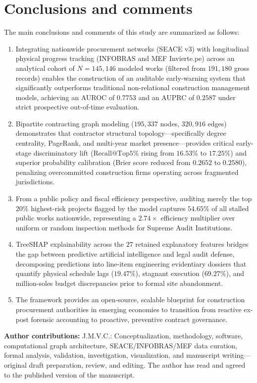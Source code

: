 \documentclass[10pt,a4paper]{article}
\begin{document}
\section*{Conclusions and comments}
The main conclusions and comments of this study are summarized as follows:
\begin{enumerate}
    \item Integrating nationwide procurement networks (SEACE v3) with longitudinal physical progress tracking (INFOBRAS and MEF Invierte.pe) across an analytical cohort of $N = 145,146$ modeled works (filtered from $191,180$ gross records) enables the construction of an auditable early-warning system that significantly outperforms traditional non-relational construction management models, achieving an AUROC of $0.7753$ and an AUPRC of $0.2587$ under strict prospective out-of-time evaluation.
    \item Bipartite contracting graph modeling ($195,337$ nodes, $320,916$ edges) demonstrates that contractor structural topology---specifically degree centrality, PageRank, and multi-year market presence---provides critical early-stage discriminatory lift ($\text{Recall@Top5\%}$ rising from $16.53\%$ to $17.25\%$) and superior probability calibration (Brier score reduced from $0.2652$ to $0.2580$), penalizing overcommitted construction firms operating across fragmented jurisdictions.
    \item From a public policy and fiscal efficiency perspective, auditing merely the top $20\%$ highest-risk projects flagged by the model captures $54.65\%$ of all stalled public works nationwide, representing a $2.74\times$ efficiency multiplier over uniform or random inspection methods for Supreme Audit Institutions.
    \item TreeSHAP explainability across the $27$ retained explanatory features bridges the gap between predictive artificial intelligence and legal audit defense, decomposing predictions into line-item engineering evidentiary dossiers that quantify physical schedule lags ($19.47\%$), stagnant execution ($69.27\%$), and million-soles budget discrepancies prior to formal site abandonment.
    \item The framework provides an open-source, scalable blueprint for construction procurement authorities in emerging economies to transition from reactive ex-post forensic accounting to proactive, preventive contract governance.
\end{enumerate}

\noindent\textbf{Author contributions:} J.M.V.C.: Conceptualization, methodology, software, computational graph architecture, SEACE/INFOBRAS/MEF data curation, formal analysis, validation, investigation, visualization, and manuscript writing---original draft preparation, review, and editing. The author has read and agreed to the published version of the manuscript.
\vspace{0.2cm}
\end{document}
